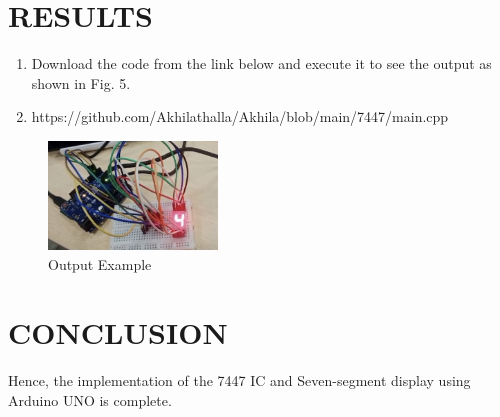 \documentclass[conference]{IEEEtran}
\begin{document}
\section{RESULTS}
\begin{enumerate}
\item Download the code from the link below and execute it to see the output as shown in Fig. 5.
\item https://github.com/Akhilathalla/Akhila/blob/main/7447/main.cpp
\end{enumerate}

\begin{figure}[htbp] 
\centering 
\includegraphics[width=0.4\textwidth]{IMG-20241119-WA0002.jpg}
\caption{\label{fig:Gates} Output Example}    
\end{figure}

\section{CONCLUSION}
Hence, the implementation of the 7447 IC and Seven-segment display using Arduino UNO is complete.
\end{document}
